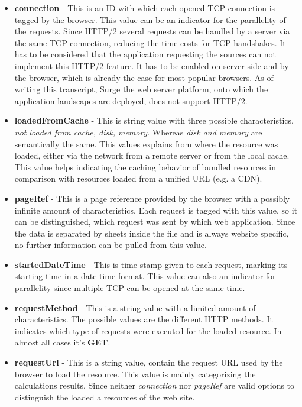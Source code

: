 \begin{itemize}
	\item \textbf{connection} - This is an ID with which each opened TCP connection is tagged by the browser. This value can be an indicator for the parallelity of the requests. Since HTTP/2 several requests can be handled by a server via the same TCP connection, reducing the time costs for TCP handshakes. It has to be considered that the application requesting the sources can not implement this HTTP/2 feature. It has to be enabled on server side and by the browser, which is already the case for most popular browsers.\cite{http2} As of writing this transcript, Surge the web server platform, onto which the application landscapes are deployed, does not support HTTP/2.
	
	\item \textbf{loadedFromCache} - This is string value with three possible characteristics, \textit{not loaded from cache, disk, memory}. Whereas \textit{disk and memory} are semantically the same. This values explains from where the resource was loaded, either via the network from a remote server or from the local cache. This value helps indicating the caching behavior of bundled resources in comparison with resources loaded from a unified URL (e.g. a CDN). 
	
	\item \textbf{pageRef} - This is a page reference provided by the browser with a possibly infinite amount of characteristics. Each request is tagged with this value, so it can be distinguished, which request was sent by which web application. Since the data is separated by sheets inside the file and is always website specific, no further information can be pulled from this value.
	
	\item \textbf{startedDateTime} - This is time stamp given to each request, marking its starting time in a date time format. This value can also an indicator for parallelity since multiple TCP can be opened at the same time. 
	
	\item \textbf{requestMethod}	- This is a string value with a limited amount of characteristics. The possible values are the different HTTP methods. It indicates which type of requests were executed for the loaded resource. In almost all cases it's \textbf{GET}.
	
	\item \textbf{requestUrl} - This is a string value, contain the request URL used by the browser to load the resource. This value is mainly categorizing the calculations results. Since neither \textit{connection} nor \textit{pageRef} are valid options to distinguish the loaded a resources of the web site. 
	

\end{itemize}
